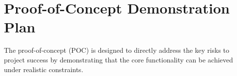 \documentclass{article}
\begin{document}


\section{Proof-of-Concept Demonstration Plan}

The proof-of-concept (POC) is designed to directly address the key risks to project success by demonstrating that the core functionality can be achieved under realistic constraints.
\end{document}
